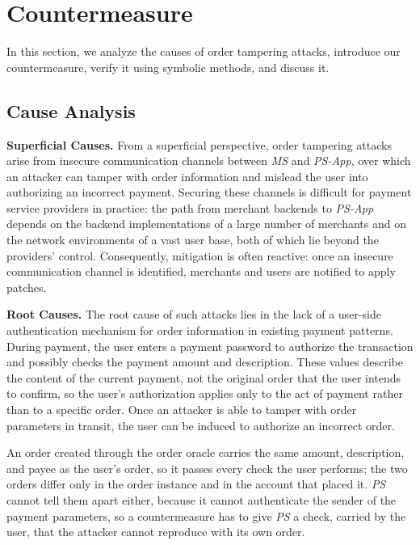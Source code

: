 \section{Countermeasure} \label{sec:countermeasure}

In this section, we analyze the causes of order tampering attacks, introduce our countermeasure, verify it using symbolic methods, and discuss it.

\subsection{Cause Analysis}

\textbf{Superficial Causes.}
From a superficial perspective, order tampering attacks arise from insecure communication channels between \emph{MS} and \emph{PS-App}, over which an attacker can tamper with order information and mislead the user into authorizing an incorrect payment.
Securing these channels is difficult for payment service providers in practice: the path from merchant backends to \emph{PS-App} depends on the backend implementations of a large number of merchants and on the network environments of a vast user base, both of which lie beyond the providers' control.
Consequently, mitigation is often reactive: once an insecure communication channel is identified, merchants and users are notified to apply patches.

\textbf{Root Causes.}
The root cause of such attacks lies in the lack of a user-side authentication mechanism for order information in existing payment patterns.
During payment, the user enters a payment password to authorize the transaction and possibly checks the payment amount and description.
These values describe the content of the current payment, not the original order that the user intends to confirm, so the user's authorization applies only to the act of payment rather than to a specific order.
Once an attacker is able to tamper with order parameters in transit, the user can be induced to authorize an incorrect order.

An order created through the order oracle carries the same amount, description, and payee as the user's order, so it passes every check the user performs; the two orders differ only in the order instance and in the account that placed it.
\emph{PS} cannot tell them apart either, because it cannot authenticate the sender of the payment parameters, so a countermeasure has to give \emph{PS} a check, carried by the user, that the attacker cannot reproduce with its own order.

